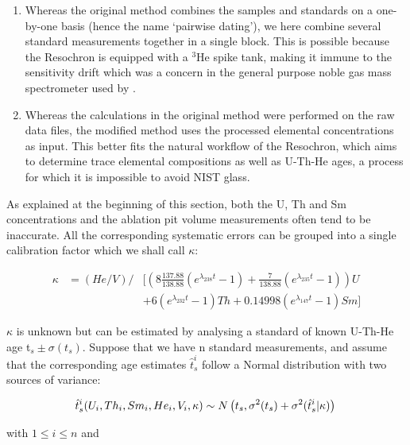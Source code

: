 \documentclass{article}
\begin{document}
\begin{enumerate}
\item Whereas the original method combines the samples and standards
  on a one-by-one basis (hence the name `pairwise dating'), we here
  combine several standard measurements together in a single
  block. This is possible because the Resochron is equipped with a
  $^3$He spike tank, making it immune to the sensitivity drift which
  was a concern in the general purpose noble gas mass spectrometer
  used by \citet{vermeesch2012a}.
\item Whereas the calculations in the original method were performed
  on the raw data files, the modified method uses the processed
  elemental concentrations as input. This better fits the natural
  workflow of the Resochron, which aims to determine trace elemental
  compositions as well as U-Th-He ages, a process for which it is
  impossible to avoid NIST glass.
\end{enumerate}

As explained at the beginning of this section, both the U, Th and Sm
concentrations and the ablation pit volume measurements often tend to
be inaccurate. All the corresponding systematic errors can be grouped
into a single calibration factor which we shall call $\kappa$:

\begin{equation}
\begin{array}{rcl}
\kappa  & =  (He/V) \Big/ & \Big[ \left( 8 \frac{137.88}{138.88} (e^{\lambda_{238}t}-1) + 
\frac{7}{138.88} (e^{\lambda_{235}t}-1)\right) U \\ 
~& ~ & + 6 (e^{\lambda_{232}t}-1) Th + 0.1499 8 (e^{\lambda_{147}t}-1) Sm \Big]
\end{array}
\label{eq:kappa}
\end{equation}

$\kappa$ is unknown but can be estimated by analysing a standard of
known U-Th-He age t$_s \pm \sigma(t_s)$. Suppose that we have n
standard measurements, and assume that the corresponding age estimates
$\hat{t}_s^i$ follow a Normal distribution with two sources of
variance:

\begin{equation}
\hat{t}_s^i(U_i,Th_i,Sm_i,He_i,V_i,\kappa) \sim N\left(t_s,\sigma^2(t_s) + \sigma^2(\hat{t}_s^i|\kappa)\right)\\
\label{eq:thats}
\end{equation}

with $1 \leq i \leq n$ and
\end{document}
